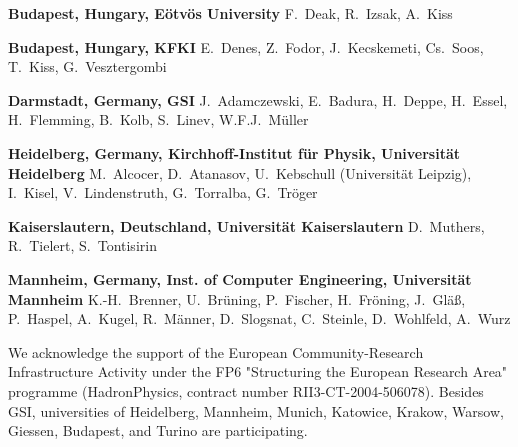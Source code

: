 
\begin{compactitem}[$\bullet$]
\item {\bf Budapest, Hungary, E{\"o}tv{\"o}s University \footnotemark[1] }
F.~Deak,
R.~Izsak,
A.~Kiss

\item {\bf Budapest, Hungary, KFKI \footnotemark[1] }
E.~Denes,
Z.~Fodor,
J.~Kecskemeti,
Cs.~Soos,
T.~Kiss,
G.~Vesztergombi

\item {\bf Darmstadt, Germany, GSI }
J.~Adamczewski,
E.~Badura,
H.~Deppe,
H.~Essel,
H.~Flemming,
B.~Kolb,
S.~Linev,
W.F.J.~M{\"u}ller

\item {\bf Heidelberg, Germany, Kirchhoff-Institut f{\"u}r Physik,
Universit{\"a}t Heidelberg\footnotemark[1] }
M.~Alcocer,
D.~Atanasov,
U.~Kebschull (Universit{\"a}t Leipzig),
I.~Kisel,
V.~Lindenstruth,
G.~Torralba,
G.~Tr{\"o}ger

\item {\bf Kaiserslautern, Deutschland, Universit{\"a}t Kaiserslautern
  \footnotemark[1]}
D.~Muthers,
R.~Tielert,
S.~Tontisirin

\item {\bf Mannheim, Germany, Inst. of Computer Engineering,
Universit{\"a}t Mannheim \footnotemark[1]}
K.-H.~Brenner,
U.~Br{\"u}ning,
P.~Fischer,
H.~Fr{\"o}ning,
J.~Gl{\"a}{\ss},
P.~Haspel,
A.~Kugel,
R.~M{\"a}nner,
D.~Slogsnat,
C.~Steinle,
D.~Wohlfeld,
A.~Wurz

\end{compactitem}

\vspace{10cm}



\noindent We acknowledge the support of the European Community-Research Infrastructure Activity
under the FP6 "Structuring the European Research Area" programme
(HadronPhysics, contract number RII3-CT-2004-506078).
Besides GSI, universities of Heidelberg, Mannheim, Munich, Katowice, Krakow, Warsow, Giessen, Budapest, and Turino are participating.
